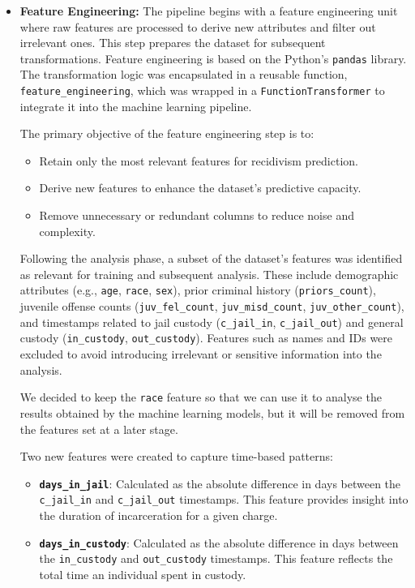 	\begin{itemize}
		\item \textbf{Feature Engineering:}
		The pipeline begins with a feature engineering unit where raw features are processed to derive new attributes and filter out irrelevant ones. This step prepares the dataset for subsequent transformations. Feature engineering is based on the Python’s \texttt{pandas} library. The transformation logic was encapsulated in a reusable function, \texttt{feature\_engineering}, which was wrapped in a \texttt{FunctionTransformer} to integrate it into  the machine learning pipeline. 
		
		The primary objective of the feature engineering step is to:
		\begin{itemize}
			\item Retain only the most relevant features for recidivism prediction.
			\item Derive new features to enhance the dataset’s predictive capacity.
			\item Remove unnecessary or redundant columns to reduce noise and complexity.
		\end{itemize}
		
		Following the analysis phase, a subset of the dataset's features was identified as relevant for training and subsequent analysis. These include demographic attributes (e.g., \texttt{age}, \texttt{race}, \texttt{sex}), prior criminal history (\texttt{priors\_count}), juvenile offense counts (\texttt{juv\_fel\_count}, \texttt{juv\_misd\_count}, \texttt{juv\_other\_count}), and timestamps related to jail custody (\texttt{c\_jail\_in}, \texttt{c\_jail\_out}) and general custody (\texttt{in\_custody}, \texttt{out\_custody}). Features such as names and IDs were excluded to avoid introducing irrelevant or sensitive information into the analysis.
		
		We decided to keep the \texttt{race} feature so that we can use it to analyse the results obtained by the machine learning models, but it will be removed from the features set at a later stage.
		
		Two new features were created to capture time-based patterns:
		\begin{itemize}
			\item \textbf{\texttt{days\_in\_jail}}: Calculated as the absolute difference in days between the \texttt{c\_jail\_in} and \texttt{c\_jail\_out} timestamps. This feature provides insight into the duration of incarceration for a given charge.
			\item \textbf{\texttt{days\_in\_custody}}: Calculated as the absolute difference in days between the \texttt{in\_custody} and \texttt{out\_custody} timestamps. This feature reflects the total time an individual spent in custody.
		\end{itemize}
		

\end{itemize}
